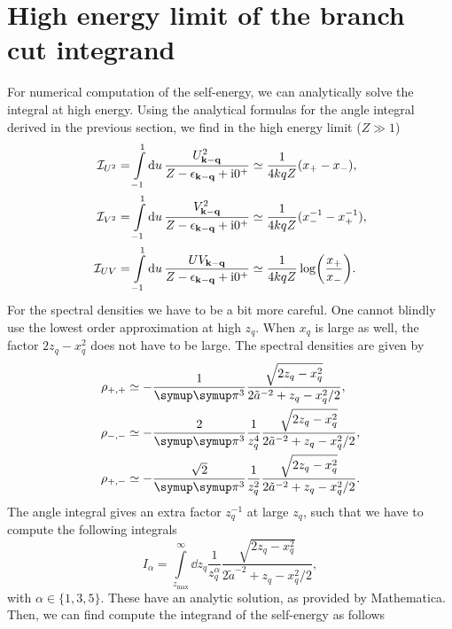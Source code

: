 \documentclass[10pt,a4paper]{article}
\let\canpi\pi
\renewcommand\pi{\symup\canpi}%
\newcommand{\ii}{\ensuremath{\mathrm{i}}}
\newcommand{\epskq}{\ensuremath{\epsilon_{\vb{k}-\vb{q}}}}
\begin{document}
\clearpage
\section{High energy limit of the branch cut integrand}

For numerical computation of the self-energy, we can analytically solve the integral at high energy. Using the analytical formulas for the angle integral derived in the previous section, we find in the high energy limit ($Z\gg 1$)
\begin{align}
    \mathcal{I}_{U^2} &= \int\limits_{-1}^{1} \dd{u}
        \frac{U_{\vb{k}-\vb{q}}^2}{Z-\epskq + \ii 0^+}
    \simeq \frac{1}{4kq Z} (x_+ - x_-), \\
    \mathcal{I}_{V^2} &= \int\limits_{-1}^{1} \dd{u}
        \frac{V_{\vb{k}-\vb{q}}^2}{Z-\epskq + \ii 0^+}
    \simeq \frac{1}{4kq Z} (x_-^{-1} - x_+^{-1}), \\
    \mathcal{I}_{UV} &= \int\limits_{-1}^{1} \dd{u}
        \frac{UV_{\vb{k}-\vb{q}}}{Z-\epskq + \ii 0^+}
    \simeq \frac{1}{4kq Z} \log(\frac{x_+}{x_-}).
\end{align}
For the spectral densities we have to be a bit more careful. One cannot blindly use the lowest order approximation at high $z_q$. When $x_q$ is large as well, the factor $2 z_q-x_q^2$ does not have to be large. The spectral densities are given by 
\begin{align}
    \rho_{+,+} &\simeq -\frac{1}{\pi^3} 
        \frac{\sqrt{2 z_q-x_q^2}}{2\tilde{a}^{-2} + z_q - x_q^2/2}, \\
    \rho_{-,-} &\simeq -\frac{2}{\pi^3} \frac{1}{z_q^4}
        \frac{\sqrt{2 z_q-x_q^2}}{2\tilde{a}^{-2} + z_q - x_q^2/2}, \\
    \rho_{+,-} &\simeq -\frac{\sqrt{2}}{\pi^3} \frac{1}{z_q^2}
        \frac{\sqrt{2 z_q-x_q^2}}{2\tilde{a}^{-2} + z_q - x_q^2/2}.
\end{align}
The angle integral gives an extra factor $z_q^{-1}$ at large $z_q$, such that we have to compute the following integrals
\begin{equation}
    I_\alpha = \int\limits_{z_\mathrm{max}}^{\infty} \dd{z_q} \frac{1}{z_q^\alpha}
        \frac{\sqrt{2 z_q-x_q^2}}{2\tilde{a}^{-2} + z_q - x_q^2/2},
\end{equation}
with $\alpha \in \{1,3,5\}$. These have an analytic solution, as provided by Mathematica. Then, we can find compute the integrand of the self-energy as follows
\end{document}
